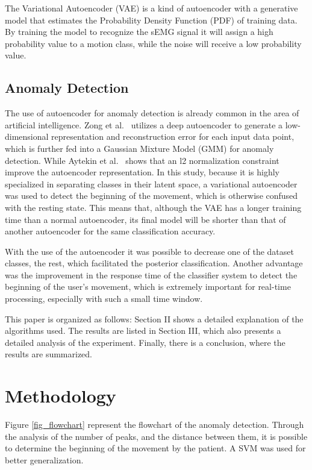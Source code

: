 \documentclass[nouppercase]{ifmbe}
\begin{document}
The Variational Autoencoder (VAE) is a kind of autoencoder with a generative model that estimates the Probability Density Function (PDF) of training data. By training the model to recognize the sEMG signal it will assign a high probability value to a motion class, while the noise will receive a low probability value\cite{Welling}.

\subsection{Anomaly Detection}
The use of autoencoder for anomaly detection is already common in the area of artificial intelligence. Zong et al.~\cite{Zong2018} utilizes a deep autoencoder to generate a low-dimensional representation and reconstruction error for each input data point, which is further fed into a Gaussian Mixture Model (GMM) for anomaly detection. While Aytekin et al.~\cite{Aytekin2018} shows that an l2 normalization constraint improve the autoencoder representation. In this study, because it is highly specialized in separating classes in their latent space, a variational autoencoder was used to detect the beginning of the movement, which is otherwise confused with the resting state. This means that, although the VAE has a longer training time than a normal autoencoder, its final model will be shorter than that of another autoencoder for the same classification accuracy.

With the use of the autoencoder it was possible to decrease one of the dataset classes, the rest, which facilitated the posterior classification. Another advantage was the improvement in the response time of the classifier system to detect the beginning of the user's movement, which is extremely important for real-time processing, especially with such a small time window.

This paper is organized as follows: Section II shows a detailed explanation of the algorithms used. The results are listed in Section III, which also presents a detailed analysis of the experiment. Finally, there is a conclusion, where the results are summarized.

\section{Methodology}

Figure \ref{fig_flowchart} represent the flowchart of the anomaly detection. Through the analysis of the number of peaks, and the distance between them, it is possible to determine the beginning of the movement by the patient. A SVM was used for better generalization.
\end{document}
